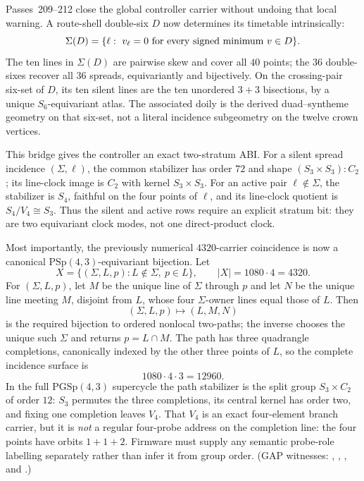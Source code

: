 \documentclass[11pt]{article}
\newcommand{\PSp}{\mathrm{PSp}}
\begin{document}
Passes~209--212 close the global controller carrier without undoing that
local warning.  A route-shell double-six $D$ now determines its timetable
intrinsically:
\[
 \Sigma(D)=\{\ell:\ v_\ell=0\ \hbox{for every signed minimum }v\in D\}.
\]
The ten lines in $\Sigma(D)$ are pairwise skew and cover all $40$ points;
the $36$ double-sixes recover all $36$ spreads, equivariantly and
bijectively.  On the crossing-pair six-set of $D$, its ten silent lines are
the ten unordered $3+3$ bisections, by a unique $S_6$-equivariant atlas.
The associated doily is the derived duad--syntheme geometry on that six-set,
not a literal incidence subgeometry on the twelve crown vertices.

This bridge gives the controller an exact two-stratum ABI.  For a silent
spread incidence $(\Sigma,\ell)$, the common stabilizer has order $72$ and
shape $(S_3\times S_3){:}C_2$; its line-clock image is $C_2$ with kernel
$S_3\times S_3$.  For an active pair $\ell\notin\Sigma$, the stabilizer is
$S_4$, faithful on the four points of $\ell$, and its line-clock quotient is
$S_4/V_4\cong S_3$.  Thus the silent and active rows require an explicit
stratum bit: they are two equivariant clock modes, not one direct-product
clock.

Most importantly, the previously numerical $4320$-carrier coincidence is
now a canonical $\PSp(4,3)$-equivariant bijection.  Let
\[
 X=\{(\Sigma,L,p):L\notin\Sigma,\ p\in L\},\qquad
 |X|=1080\cdot4=4320.
\]
For $(\Sigma,L,p)$, let $M$ be the unique line of $\Sigma$ through $p$ and
let $N$ be the unique line meeting $M$, disjoint from $L$, whose four
$\Sigma$-owner lines equal those of $L$.  Then
\[
 (\Sigma,L,p)\longmapsto(L,M,N)
\]
is the required bijection to ordered nonlocal two-paths; the inverse chooses
the unique such $\Sigma$ and returns $p=L\cap M$.  The path has three
quadrangle completions, canonically indexed by the other three points of
$L$, so the complete incidence surface is
\[
 1080\cdot4\cdot3=12960.
\]
In the full $\mathrm{PGSp}(4,3)$ supercycle the path stabilizer is the split
group $S_3\times C_2$ of order $12$: $S_3$ permutes the three completions,
its central kernel has order two, and fixing one completion leaves $V_4$.
That $V_4$ is an exact four-element branch carrier, but it is \emph{not} a
regular four-probe address on the completion line: the four points have
orbits $1+1+2$.  Firmware must supply any semantic probe-role labelling
separately rather than infer it from group order.  (GAP witnesses:
,
,
, and
.)
\end{document}
